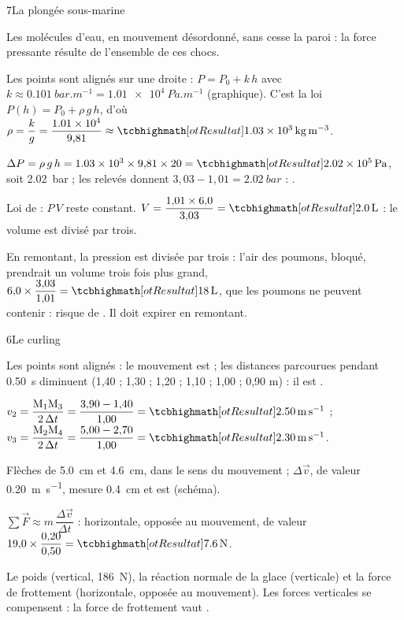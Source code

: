 \begin{corrigeBac}{7}{La plongée sous-marine}
\begin{questions}
\item Les molécules d'eau, en mouvement désordonné,  sans cesse la paroi : la force pressante résulte de
l'ensemble de ces chocs. \pts{1 pt}
\item Les points sont alignés sur une droite : $P=P_0+k\,h$ avec $k\approx\qty{0,101}{bar.m^{-1}}=\qty{1,01e4}{Pa.m^{-1}}$ (graphique). C'est
la loi $P(h)=P_0+\rho\,g\,h$, d'où $\rho=\dfrac{k}{g}=\dfrac{\num{1,01e4}}{9{,}81}\approx\res{\qty{1,03e3}{kg.m^{-3}}}$. 
\item $\Delta P=\rho\,g\,h=\num{1,03e3}\times9{,}81\times20=\res{\qty{2,02e5}{Pa}}$, soit \qty{2,02}{bar} ; les relevés donnent $3{,}03-1{,}01=\qty{2,02}{bar}$ : . \pts{1 pt}
\item Loi de  : $P\,V$ reste constant. $V=\dfrac{1{,}01\times6{,}0}{3{,}03}=\res{\qty{2,0}{L}}$ : le volume est divisé par trois. 
\item En remontant, la pression est divisée par trois : l'air des poumons, bloqué, prendrait un volume trois fois plus grand,
$6{,}0\times\dfrac{3{,}03}{1{,}01}=\res{\qty{18}{L}}$, que les poumons ne peuvent contenir : risque de . Il doit expirer en remontant. 
\end{questions}
\end{corrigeBac}

\begin{corrigeBac}{6}{Le curling}
\begin{questions}
\item Les points sont alignés : le mouvement est  ; les distances parcourues pendant \qty{0,50}{s} diminuent
(1,40 ; 1,30 ; 1,20 ; 1,10 ; 1,00 ; 0,90 m) : il est . \pts{1 pt}
\item $v_2=\dfrac{\mathrm{M_1M_3}}{2\,\Delta t}=\dfrac{3{,}90-1{,}40}{1{,}00}=\res{\qty{2,50}{m.s^{-1}}}$ ; $v_3=\dfrac{\mathrm{M_2M_4}}{2\,\Delta t}=\dfrac{5{,}00-2{,}70}{1{,}00}=\res{\qty{2,30}{m.s^{-1}}}$. 
\item Flèches de \qty{5,0}{cm} et \qty{4,6}{cm}, dans le sens du mouvement ; $\Delta\vec v$, de valeur \qty{0,20}{m.s^{-1}}, mesure \qty{0,4}{cm} et est
 (schéma). \pts{1 pt}
\item $\sum\vec F\approx m\,\dfrac{\Delta\vec v}{\Delta t}$ : horizontale, opposée au mouvement, de valeur $19{,}0\times\dfrac{0{,}20}{0{,}50}=\res{\qty{7,6}{N}}$. 
\item Le poids (vertical, \qty{186}{N}), la réaction normale de la glace (verticale) et la force de frottement (horizontale, opposée
au mouvement). Les forces verticales se compensent : la force de frottement vaut . \pts{1 pt}
\end{questions}
\end{corrigeBac}

